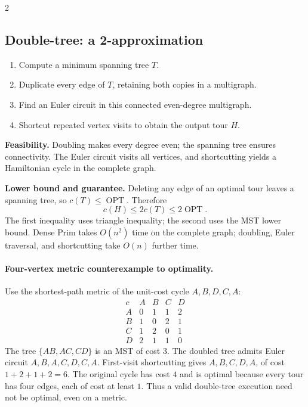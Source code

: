 \documentclass[8pt]{extarticle}
\theoremstyle{definition}
\newcommand{\OPT}{\operatorname{OPT}}
\begin{document}
\begin{multicols*}{2}
\subsection{Double-tree: a 2-approximation}\label{tsp:doubletree}
\begin{enumerate}
  \item Compute a minimum spanning tree $T$.
  \item Duplicate every edge of $T$, retaining both copies in a multigraph.
  \item Find an Euler circuit in this connected even-degree multigraph.
  \item Shortcut repeated vertex visits to obtain the output tour $H$.
\end{enumerate}
\textbf{Feasibility.} Doubling makes every degree even; the spanning tree
ensures connectivity.  The Euler circuit visits all vertices, and
shortcutting yields a Hamiltonian cycle in the complete graph.

\textbf{Lower bound and guarantee.} Deleting any edge of an optimal tour
leaves a spanning tree, so $c(T)\le\OPT$.  Therefore
\[
\boxed{\ c(H)\le 2c(T)\le2\OPT.\ }
\]
The first inequality uses triangle inequality; the second uses the MST lower
bound.  Dense Prim takes $O(n^2)$ time on the complete graph; doubling,
Euler traversal, and shortcutting take $O(n)$ further time.

\paragraph{Four-vertex metric counterexample to optimality.}
Use the shortest-path metric of the unit-cost cycle $A,B,D,C,A$:
\[
\begin{array}{c|rrrr}
c & A&B&C&D\\\hline
A&0&1&1&2\\
B&1&0&2&1\\
C&1&2&0&1\\
D&2&1&1&0
\end{array}
\]
The tree $\{AB,AC,CD\}$ is an MST of cost $3$.  The doubled tree admits
Euler circuit $A,B,A,C,D,C,A$.  First-visit shortcutting gives
$A,B,C,D,A$, of cost $1+2+1+2=6$.  The original cycle has cost $4$ and is
optimal because every tour has four edges, each of cost at least $1$.
Thus a valid double-tree execution need not be optimal, even on a metric.


\end{multicols*}
\end{document}
